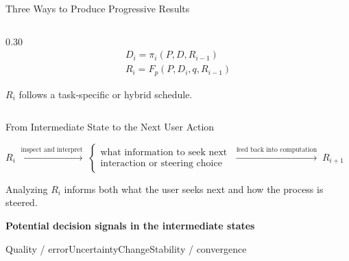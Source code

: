 \documentclass[aspectratio=169]{beamer}
\begin{document}
\begin{frame}{Three Ways to Produce Progressive Results}
\begin{columns}[T,onlytextwidth]
\begin{column}{0.30\textwidth}
      {\centering\scriptsize\[
        \begin{gathered}
          D_i=\pi_i(P,D,R_{i-1})\\[-0.1em]
          R_i=F_p(P,D_i,q,R_{i-1})
        \end{gathered}
      \]}
      \vspace{0.1em}
      \begin{minipage}[t][0.8cm][t]{\linewidth}
        \footnotesize $R_i$ follows a task-specific or hybrid schedule.
      \end{minipage}
    \end{column}
  \end{columns}
  \vfill
\end{frame}

\begin{frame}{From Intermediate State to the Next User Action}
  \centering
  \vspace{0.5em}
  {\large
  $R_i\;\xrightarrow{\text{inspect and interpret}}\;
  \left\{\begin{array}{c}
    \text{what information to seek next}\\[0.25em]
    \text{interaction or steering choice}
  \end{array}\right.\;
  \xrightarrow{\text{feed back into computation}}\;R_{i+1}$\par}
  \vspace{0.8em}
  {\normalsize Analyzing $R_i$ informs both what the user seeks next and how the process is steered.\par}
  \vspace{0.8em}
  {\small\bfseries\color{ConferenceBlue}Potential decision signals in the intermediate states\par}
  \vspace{0.25em}
  {\small Quality / error\qquad Uncertainty\qquad Change\qquad Stability / convergence\par}
  \vfill
\end{frame}
\end{document}
